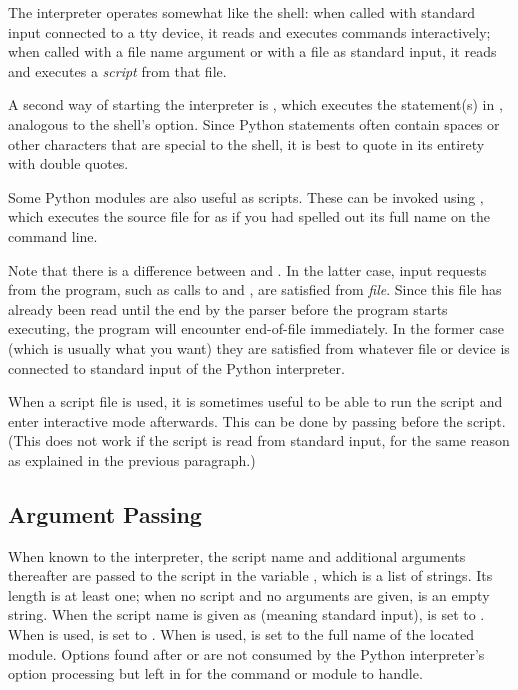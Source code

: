 \documentclass{manual}
\begin{document}
The interpreter operates somewhat like the \UNIX{} shell: when called
with standard input connected to a tty device, it reads and executes
commands interactively; when called with a file name argument or with
a file as standard input, it reads and executes a \emph{script} from
that file. 

A second way of starting the interpreter is
, which
executes the statement(s) in , analogous to the shell's
 option.  Since Python statements often contain spaces
or other characters that are special to the shell, it is best to quote 
 in its entirety with double quotes.

Some Python modules are also useful as scripts.  These can be invoked using
, which
executes the source file for  as if you had spelled out its
full name on the command line.

Note that there is a difference between  and
.  In the latter case, input requests from the
program, such as calls to  and , are
satisfied from \emph{file}.  Since this file has already been read
until the end by the parser before the program starts executing, the
program will encounter end-of-file immediately.  In the former case
(which is usually what you want) they are satisfied from whatever file
or device is connected to standard input of the Python interpreter.

When a script file is used, it is sometimes useful to be able to run
the script and enter interactive mode afterwards.  This can be done by
passing  before the script.  (This does not work if the
script is read from standard input, for the same reason as explained
in the previous paragraph.)

\subsection{Argument Passing \label{argPassing}}

When known to the interpreter, the script name and additional
arguments thereafter are passed to the script in the variable
, which is a list of strings.  Its length is at least
one; when no script and no arguments are given,  is
an empty string.  When the script name is given as  (meaning 
standard input),  is set to .  When
  is used,  is set to
.  When   is used,  
is set to the full name of the located module.  Options found after 
  or   are not consumed 
by the Python interpreter's option processing but left in  for 
the command or module to handle.
\end{document}
